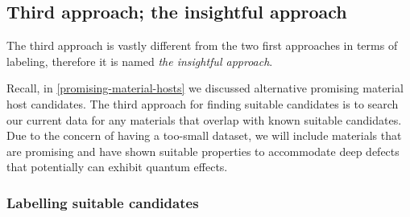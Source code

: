 \begin{table}[!ht]
\centering
\caption{A table showing the number of entries through the data mining process for suitable candidates in approach $2$ and unsuitable candidates in approach $1$ and $2$.}
\label{tab:suitable-unsuitable-candidates}
\noindent{}
\end{table}

\subsection{Third approach; the insightful approach}

The third approach is vastly different from the two first approaches in terms of labeling, therefore it is named \textit{the insightful approach}.

Recall, in \autoref{promising-material-hosts} we discussed alternative promising material host candidates. The third approach for finding suitable candidates is to search our current data for any materials that overlap with known suitable candidates. Due to the concern of having a too-small dataset, we will include materials that are promising and have shown suitable properties to accommodate deep defects that potentially can exhibit quantum effects.


\subsubsection{Labelling suitable candidates}

